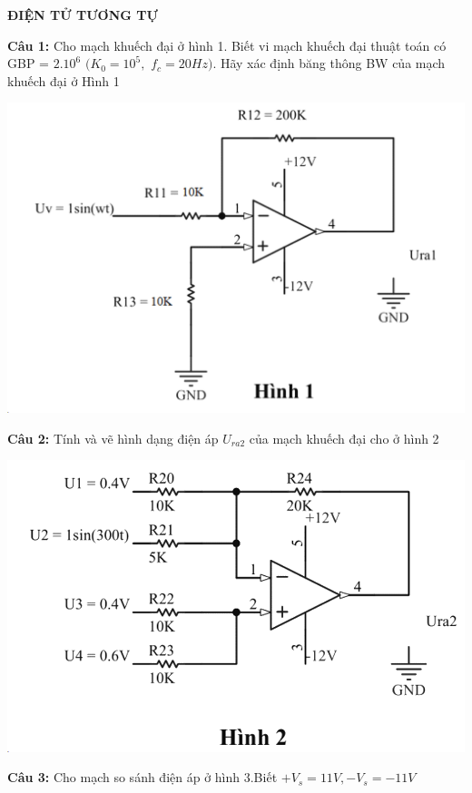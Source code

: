 \documentclass[10pt,a4paper]{article}
\author{Vu Duc Cuong - 20202313}
\date{\today}
\begin{document}
		\begin{center}
			\color{red}
			\textbf{{\LARGE{ĐIỆN TỬ TƯƠNG TỰ}}}
			\color{black}
		\end{center}
		\begin{flushleft}
			\color{red}\textbf{Câu 1: }\color{black} Cho mạch khuếch đại ở hình 1. Biết vi mạch khuếch đại thuật toán có GBP = $2.10^{6}$ $( K_0 = 10^{5},$ $ f_{c} = 20Hz)$. Hãy xác định băng thông BW của mạch khuếch đại ở Hình 1
		\end{flushleft}
		\begin{center}
			\includegraphics[width=0.9\linewidth]{screenshot001}
		\end{center}
		\vspace{1cm}
		\begin{flushleft}
			\color{red}\textbf{Câu 2: }\color{black} Tính và vẽ hình dạng điện áp $U_{ra2}$ của mạch khuếch đại cho ở hình 2
		\end{flushleft}
		\begin{center}
			\includegraphics[width=0.9\linewidth]{screenshot002}
		\end{center}
		\vspace{1cm}
		\begin{flushleft}
			\color{red}\textbf{Câu 3: }\color{black} Cho mạch so sánh điện áp ở hình 3.Biết $+V_{s} = 11V , -V_{s} = -11V$
		\end{flushleft}
		
\end{document}
